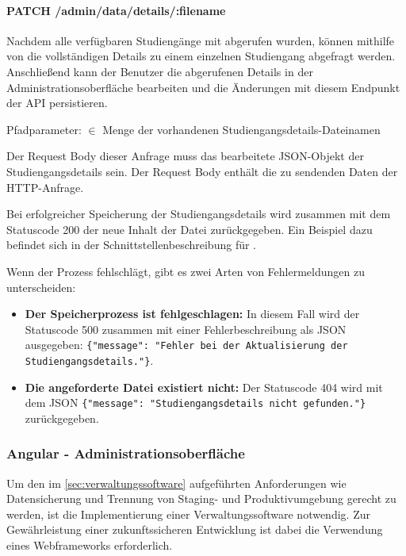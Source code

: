 \paragraph*{PATCH /admin/data/details/:filename}
\vspace{-1.0em}
Nachdem alle verfügbaren Studiengänge mit  abgerufen wurden, können mithilfe von  die vollständigen Details zu einem einzelnen Studiengang abgefragt werden. Anschließend kann der Benutzer die abgerufenen Details in der Administrationsoberfläche bearbeiten und die Änderungen mit diesem Endpunkt der API persistieren.

\noindent
Pfadparameter:  $\in$ Menge der vorhandenen Studiengangsdetails-Dateinamen

Der Request Body dieser Anfrage muss das bearbeitete JSON-Objekt der Studiengangsdetails sein. Der Request Body enthält die zu sendenden Daten der HTTP-Anfrage. \parencite{parthiban_essential_2023}

Bei erfolgreicher Speicherung der Studiengangsdetails wird zusammen mit dem Statuscode 200 der neue Inhalt der Datei zurückgegeben. Ein Beispiel dazu befindet sich in der Schnittstellenbeschreibung für .

\noindent
Wenn der Prozess fehlschlägt, gibt es zwei Arten von Fehlermeldungen zu unterscheiden:
\begin{itemize}
    \item \textbf{Der Speicherprozess ist fehlgeschlagen:} In diesem Fall wird der Statuscode 500 zusammen mit einer Fehlerbeschreibung als JSON ausgegeben: \lstinline[style=python]|{"message": "Fehler bei der Aktualisierung der Studiengangsdetails."}|.
    \item \textbf{Die angeforderte Datei  existiert nicht:} Der Statuscode 404 wird mit dem JSON \lstinline[style=python]|{"message": "Studiengangsdetails nicht gefunden."}| zurückgegeben. 
\end{itemize}

\subsubsection{Angular - Administrationsoberfläche}
Um den im \autoref{sec:verwaltungssoftware} aufgeführten Anforderungen wie Datensicherung und Trennung von Staging- und Produktivumgebung gerecht zu werden, ist die Implementierung einer Verwaltungssoftware notwendig. Zur Gewährleistung einer zukunftssicheren Entwicklung ist dabei die Verwendung eines Webframeworks erforderlich.


